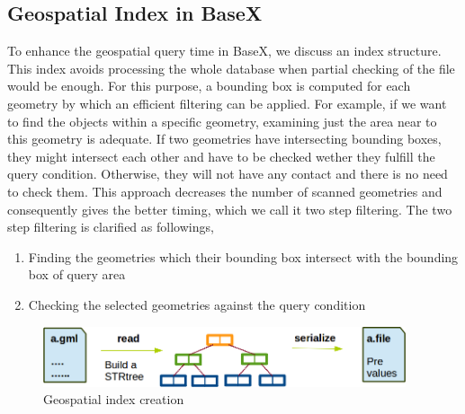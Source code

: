 \documentclass[a4paper,12pt]{article}
\begin{document}
\subsection{Geospatial Index in BaseX}
\label{indexBX}
To enhance the geospatial query time in BaseX, we discuss an index structure. This index avoids processing the whole database when partial checking of the file would be enough. For this purpose, a bounding box is computed for each geometry by which an efficient filtering can be applied. For example, if we want to find the objects within a specific geometry, examining just the area near to this geometry is adequate. If two geometries have intersecting bounding boxes, they might intersect each other and have to be checked wether they fulfill the query condition. Otherwise, they will not have any contact and there is no need to check them. This approach decreases the number of scanned geometries and consequently gives the better timing, which we call it two step filtering. The two step filtering is clarified as followings,
\begin{enumerate}
\item Finding the geometries which their bounding box intersect with the bounding box of query area
\item Checking the selected geometries against the query condition
\end{enumerate}


 \begin{figure}
\centering
\includegraphics[width=0.95\textwidth]{IndexinFile}
\caption{Geospatial index creation}
\label{figIndexinFile}
\end{figure}
\end{document}
